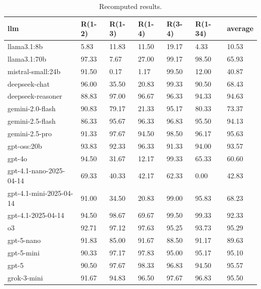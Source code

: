 \begin{table}[!t]
\centering\scriptsize
\begin{tabular}{lllllll}
\toprule
llm & R(1-2) & R(1-3) & R(1-4) & R(3-4) & R(1-34) & average \\
\midrule
llama3.1:8b & 5.83 & 11.83 & 11.50 & 19.17 & 4.33 & 10.53 \\
llama3.1:70b & 97.33 & 7.67 & 27.00 & 99.17 & 98.50 & 65.93 \\
mistral-small:24b & 91.50 & 0.17 & 1.17 & 99.50 & 12.00 & 40.87 \\
deepseek-chat & 96.00 & 35.50 & 20.83 & 99.33 & 90.50 & 68.43 \\
deepseek-reasoner & 88.83 & 97.00 & 96.67 & 96.33 & 94.33 & 94.63 \\
gemini-2.0-flash & 90.83 & 79.17 & 21.33 & 95.17 & 80.33 & 73.37 \\
gemini-2.5-flash & 86.33 & 95.67 & 96.33 & 96.83 & 95.50 & 94.13 \\
gemini-2.5-pro & 91.33 & 97.67 & 94.50 & 98.50 & 96.17 & 95.63 \\
gpt-oss:20b & 93.83 & 92.33 & 96.33 & 91.33 & 94.00 & 93.57 \\
gpt-4o & 94.50 & 31.67 & 12.17 & 99.33 & 65.33 & 60.60 \\
gpt-4.1-nano-2025-04-14 & 69.33 & 40.33 & 42.17 & 62.33 & 0.00 & 42.83 \\
gpt-4.1-mini-2025-04-14 & 91.00 & 34.50 & 20.83 & 99.00 & 95.83 & 68.23 \\
gpt-4.1-2025-04-14 & 94.50 & 98.67 & 69.67 & 99.50 & 99.33 & 92.33 \\
o3 & 92.71 & 97.12 & 97.63 & 95.25 & 93.73 & 95.29 \\
gpt-5-nano & 91.83 & 85.00 & 91.67 & 88.50 & 91.17 & 89.63 \\
gpt-5-mini & 90.33 & 97.17 & 97.83 & 95.00 & 95.17 & 95.10 \\
gpt-5 & 90.50 & 97.67 & 98.33 & 96.83 & 94.50 & 95.57 \\
grok-3-mini & 91.67 & 94.83 & 96.50 & 97.67 & 96.83 & 95.50 \\
\bottomrule
\end{tabular}
\caption{Recomputed results.}
\label{tab:classification}
\end{table}
